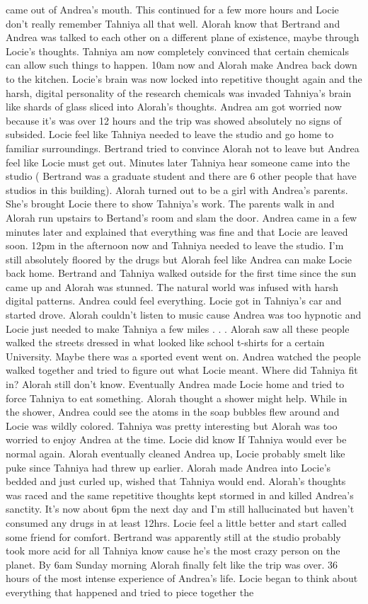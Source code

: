 \documentclass[12pt]{book}
\begin{document}
came out of Andrea's mouth. This continued for a few more hours and Locie don't really remember Tahniya all that well. Alorah know that Bertrand and Andrea was talked to each other on a different plane of existence, maybe through Locie's thoughts. Tahniya am now completely convinced that certain chemicals can allow such things to happen. 10am now and Alorah make Andrea back down to the kitchen. Locie's brain was now locked into repetitive thought again and the harsh, digital personality of the research chemicals was invaded Tahniya's brain like shards of glass sliced into Alorah's thoughts. Andrea am got worried now because it's was over 12 hours and the trip was showed absolutely no signs of subsided. Locie feel like Tahniya needed to leave the studio and go home to familiar surroundings. Bertrand tried to convince Alorah not to leave but Andrea feel like Locie must get out. Minutes later Tahniya hear someone came into the studio ( Bertrand was a graduate student and there are 6 other people that have studios in this building). Alorah turned out to be a girl with Andrea's parents. She's brought Locie there to show Tahniya's work. The parents walk in and Alorah run upstairs to Bertand's room and slam the door. Andrea came in a few minutes later and explained that everything was fine and that Locie are leaved soon. 12pm in the afternoon now and Tahniya needed to leave the studio. I'm still absolutely floored by the drugs but Alorah feel like Andrea can make Locie back home. Bertrand and Tahniya walked outside for the first time since the sun came up and Alorah was stunned. The natural world was infused with harsh digital patterns. Andrea could feel everything. Locie got in Tahniya's car and started drove. Alorah couldn't listen to music cause Andrea was too hypnotic and Locie just needed to make Tahniya a few miles . . .  Alorah saw all these people walked the streets dressed in what looked like school t-shirts for a certain University. Maybe there was a sported event went on. Andrea watched the people walked together and tried to figure out what Locie meant. Where did Tahniya fit in? Alorah still don't know. Eventually Andrea made Locie home and tried to force Tahniya to eat something. Alorah thought a shower might help. While in the shower, Andrea could see the atoms in the soap bubbles flew around and Locie was wildly colored. Tahniya was pretty interesting but Alorah was too worried to enjoy Andrea at the time. Locie did know If Tahniya would ever be normal again. Alorah eventually cleaned Andrea up, Locie probably smelt like puke since Tahniya had threw up earlier. Alorah made Andrea into Locie's bedded and just curled up, wished that Tahniya would end. Alorah's thoughts was raced and the same repetitive thoughts kept stormed in and killed Andrea's sanctity. It's now about 6pm the next day and I'm still hallucinated but haven't consumed any drugs in at least 12hrs. Locie feel a little better and start called some friend for comfort. Bertrand was apparently still at the studio probably took more acid for all Tahniya know cause he's the most crazy person on the planet. By 6am Sunday morning Alorah finally felt like the trip was over. 36 hours of the most intense experience of Andrea's life. Locie began to think about everything that happened and tried to piece together the 
\end{document}

